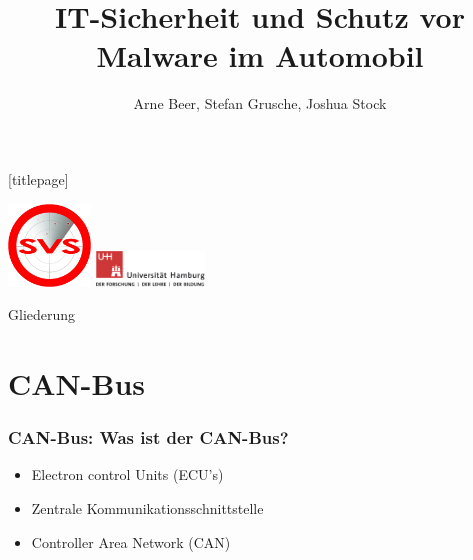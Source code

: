 \documentclass[t]{beamer}
\title{IT-Sicherheit und Schutz vor Malware im Automobil}
\author[Beer, Grusche, Stock]{Arne Beer, Stefan Grusche, Joshua Stock}
\date{}
\begin{document}
\begingroup
	[titlepage]
	\begin{frame}[plain]
		\vskip8mm
		\includegraphics[width=2.2cm]{pic/svs_logo_hires-ohne-was.png}
		\titlepage
		\vspace{\fill}
		\includegraphics[width=2.9cm]{pic/UHH-Logo_2010_Farbe_RGB_hires_nomargin.png}
		\vskip20pt
	\end{frame}
\endgroup

\begin{frame}{Gliederung}
	\tableofcontents
\end{frame}

\section{CAN-Bus}
\begin{frame}
	\frametitle{CAN-Bus: Was ist der CAN-Bus?}
	\begin{itemize}
        \item Electron control Units (ECU's)
		\item Zentrale Kommunikationsschnittstelle
        \item Controller Area Network (CAN)
	\end{itemize}
\end{frame}
\end{document}
